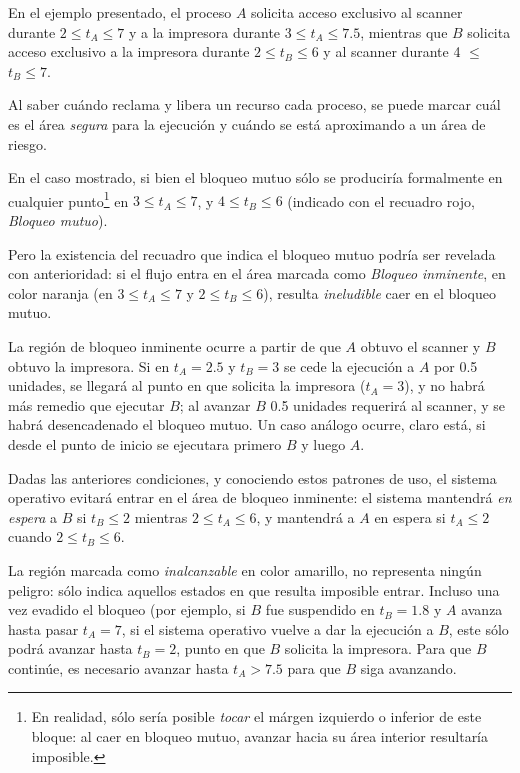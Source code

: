 \documentclass[11pt,fleqn]{book} %
\begin{document}
En el ejemplo presentado, el proceso $A$ solicita acceso
exclusivo al scanner durante $2 \le t_A \le 7$ y a la impresora
durante $3 \le t_A \le 7.5$, mientras que $B$ solicita acceso
exclusivo a la impresora durante $2 \le t_B \le 6$ y al scanner
durante 4 $\le$ $t_B \le 7$.

Al saber cuándo reclama y libera un recurso cada proceso, se puede
marcar cuál es el área \emph{segura} para la ejecución y cuándo se
está aproximando a un área de riesgo.

En el caso mostrado, si bien el bloqueo mutuo sólo se produciría
formalmente en cualquier punto\footnote{En realidad, sólo sería
posible \emph{tocar} el márgen izquierdo o inferior de este bloque: al caer
en bloqueo mutuo, avanzar hacia su área interior resultaría
imposible. } en $3 \le t_A \le 7$, y $4 \le t_B \le 6$ (indicado con el
recuadro rojo, \emph{Bloqueo mutuo}).

Pero la existencia del recuadro que indica el bloqueo mutuo podría ser
revelada con anterioridad: si el flujo entra en el área marcada como
\emph{Bloqueo inminente}, en color naranja (en $3 \le t_A \le 7$ y $2 \le
t_B \le 6$), resulta \emph{ineludible} caer en el bloqueo mutuo. 

La región de bloqueo inminente ocurre a partir de que $A$ obtuvo el
scanner y $B$ obtuvo la impresora. Si en $t_A=2.5$ y $t_B=3$ se cede
la ejecución a $A$ por 0.5 unidades, se llegará al punto en que
solicita la impresora ($t_A=3$), y no habrá más remedio que ejecutar
$B$; al avanzar $B$ 0.5 unidades requerirá al scanner, y se habrá
desencadenado el bloqueo mutuo. Un caso análogo ocurre, claro
está, si desde el punto de inicio se ejecutara primero $B$ y luego
$A$.

Dadas las anteriores condiciones, y conociendo estos patrones de uso,
el sistema operativo evitará entrar en el área de bloqueo inminente:
el sistema mantendrá \emph{en espera} a $B$ si $t_B \le 2$ mientras $2 \le
t_A \le 6$, y mantendrá a $A$ en espera si $t_A \le 2$ cuando  $2 \le t_B
\le 6$.

La región marcada como \emph{inalcanzable} en color amarillo, no representa
ningún peligro: sólo indica aquellos estados en que resulta imposible
entrar. Incluso una vez evadido el bloqueo (por ejemplo, si $B$ fue
suspendido en $t_B = 1.8$ y $A$ avanza hasta pasar $t_A = 7$, si el
sistema operativo vuelve a dar la ejecución a $B$, este sólo podrá
avanzar hasta $t_B=2$, punto en que $B$ solicita la impresora. Para
que $B$ continúe, es necesario avanzar hasta $t_A > 7.5$ para que $B$
siga avanzando.
\end{document}
